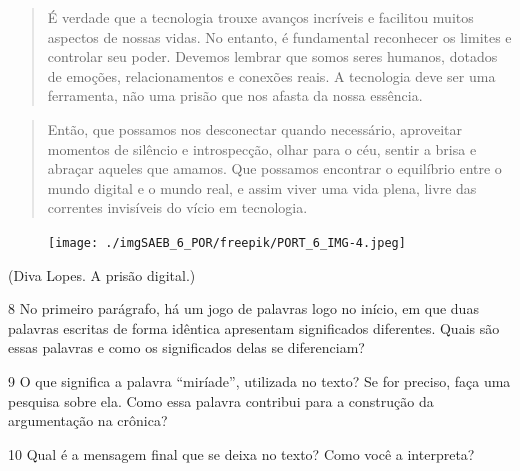 \begin{quote}
É verdade que a tecnologia trouxe avanços incríveis e facilitou muitos
aspectos de nossas vidas. No entanto, é fundamental reconhecer os
limites e controlar seu poder. Devemos lembrar que somos seres humanos,
dotados de emoções, relacionamentos e conexões reais. A tecnologia deve
ser uma ferramenta, não uma prisão que nos afasta da nossa essência.
\end{quote}

\begin{quote}
Então, que possamos nos desconectar quando necessário, aproveitar
momentos de silêncio e introspecção, olhar para o céu, sentir a brisa e
abraçar aqueles que amamos. Que possamos encontrar o equilíbrio entre o
mundo digital e o mundo real, e assim viver uma vida plena, livre das
correntes invisíveis do vício em tecnologia.
\end{quote}

\begin{figure}
\texttt{[image: ./imgSAEB\_6\_POR/freepik/PORT\_6\_IMG-4.jpeg]}
\end{figure}

(Diva Lopes. A prisão digital.)

\num{8} No primeiro parágrafo, há um jogo de palavras logo no início, em
que duas palavras escritas de forma idêntica apresentam significados
diferentes. Quais são essas palavras e como os significados delas se
diferenciam?



\num{9} O que significa a palavra ``miríade'', utilizada no texto? Se
for preciso, faça uma pesquisa sobre ela. Como essa palavra contribui
para a construção da argumentação na crônica?


\num{10} Qual é a mensagem final que se deixa no texto? Como você a
interpreta?



